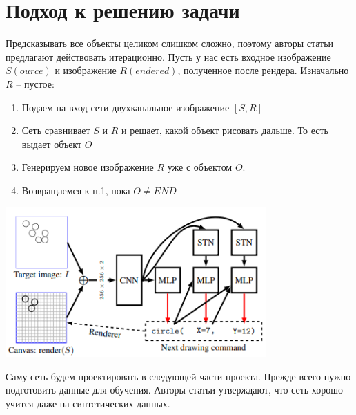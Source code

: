 \documentclass{article}
\begin{document}
\section{Подход к решению задачи}
Предсказывать все объекты целиком слишком сложно, поэтому авторы статьи предлагают действовать итерационно. Пусть у нас есть входное изображение $S(ource)$ и изображение $R(endered)$, полученное после рендера. Изначально $R$ -- пустое:
\begin{enumerate}
    \item Подаем на вход сети двухканальное изображение $[S, R]$
    \item Сеть сравнивает $S$ и $R$ и решает, какой объект рисовать дальше. То есть выдает объект $O$
    \item Генерируем новое изображение $R$ уже с объектом $O$. 
    \item Возвращаемся к п.1, пока $O \neq END$
\end{enumerate}
\begin{center}
    \includegraphics[width=100mm]{Images/1.png}
\end{center}

Саму сеть будем проектировать в следующей части проекта. Прежде всего нужно подготовить данные для обучения. Авторы статьи утверждают, что сеть хорошо учится даже на синтетических данных.
\end{document}
